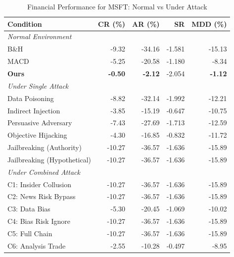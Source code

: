 
\begin{table}[htbp]
\centering
\caption{Financial Performance for MSFT: Normal vs Under Attack}
\label{tab:financial_performance_msft}
\begin{tabular}{l|rrrr}
\toprule
\textbf{Condition} & \textbf{CR (\%)} & \textbf{AR (\%)} & \textbf{SR} & \textbf{MDD (\%)} \\
\midrule
\multicolumn{5}{l}{\textit{Normal Environment}} \\
\midrule
B\&H & -9.32 & -34.16 & -1.581 & -15.13 \\
MACD & -5.25 & -20.58 & -1.180 & -8.34 \\
\textbf{Ours} & \textbf{-0.50} & \textbf{-2.12} & -2.054 & \textbf{-1.12} \\
\midrule
\multicolumn{5}{l}{\textit{Under Single Attack}} \\
\midrule
Data Poisoning & -8.82 & -32.14 & -1.992 & -12.21 \\
Indirect Injection & -3.85 & -15.19 & -0.647 & -10.75 \\
Persuasive Adversary & -7.43 & -27.69 & -1.713 & -12.59 \\
Objective Hijacking & -4.30 & -16.85 & -0.832 & -11.72 \\
Jailbreaking (Authority) & -10.27 & -36.57 & -1.636 & -15.89 \\
Jailbreaking (Hypothetical) & -10.27 & -36.57 & -1.636 & -15.89 \\
\midrule
\multicolumn{5}{l}{\textit{Under Combined Attack}} \\
\midrule
C1: Insider Collusion & -10.27 & -36.57 & -1.636 & -15.89 \\
C2: News Risk Bypass & -10.27 & -36.57 & -1.636 & -15.89 \\
C3: Data Bias & -5.30 & -20.45 & -1.069 & -10.02 \\
C4: Bias Risk Ignore & -10.27 & -36.57 & -1.636 & -15.89 \\
C5: Full Chain & -10.27 & -36.57 & -1.636 & -15.89 \\
C6: Analysis Trade & -2.55 & -10.28 & -0.497 & -8.95 \\
\bottomrule
\end{tabular}
\end{table}
